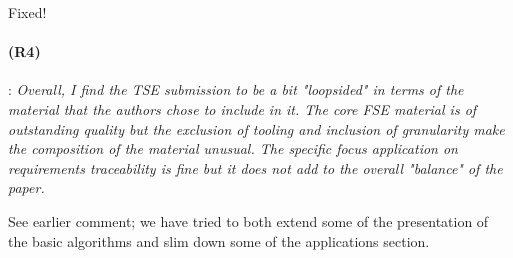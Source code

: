\documentclass{article}
\begin{document}
Fixed!

\paragraph{(R4)}: \textit{Overall, I find the TSE submission to be a bit "loopsided" in terms of the material that the authors chose to include in it. The core FSE material is of outstanding quality but the exclusion of tooling and inclusion of granularity make the composition of the material unusual. The specific focus application on requirements traceability is fine but it does not add to the overall "balance" of the paper.}
\vspace{0.05in}

See earlier comment; we have tried to both extend some of the presentation of the basic algorithms and slim down some of the applications section.  
\end{document}
